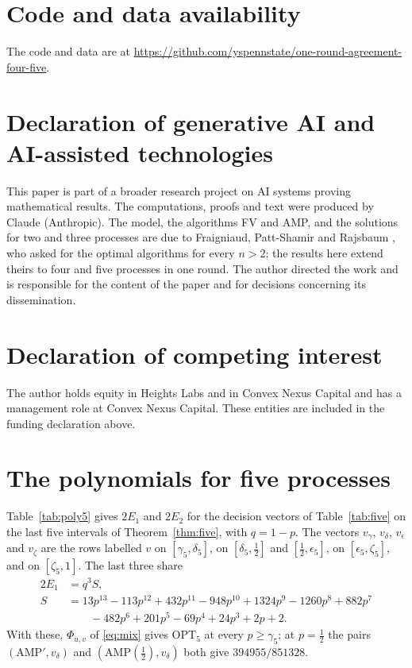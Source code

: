 \documentclass[11pt]{article}
\newcommand{\OPT}{\mathrm{OPT}}
\newcommand{\h}{\tfrac12}
\begin{document}
\section*{Code and data availability}
The code and data are at \url{https://github.com/yspennstate/one-round-agreement-four-five}.
\section*{Declaration of generative AI and AI-assisted technologies}
This paper is part of a broader research project on AI systems proving mathematical results. The computations, proofs and text were produced by Claude (Anthropic). The model, the algorithms FV and AMP, and the solutions for two and three processes are due to Fraigniaud, Patt-Shamir and Rajsbaum \cite{FPR}, who asked for the optimal algorithms for every $n>2$; the results here extend theirs to four and five processes in one round. The author directed the work and is responsible for the content of the paper and for decisions concerning its dissemination.

\section*{Declaration of competing interest}
The author holds equity in Heights Labs and in Convex Nexus Capital and has a management role at Convex Nexus Capital. These entities are included in the funding declaration above.

\appendix
\section{The polynomials for five processes}

Table~\ref{tab:poly5} gives $2E_1$ and $2E_2$ for the decision vectors of Table~\ref{tab:five} on the last five intervals of Theorem~\ref{thm:five}, with $q=1-p$. The vectors $v_{\gamma}$, $v_{\delta}$, $v_{\epsilon}$ and $v_{\zeta}$ are the rows labelled $v$ on $[\gamma_5,\delta_5]$, on $[\delta_5,\h]$ and $[\h,\epsilon_5]$, on $[\epsilon_5,\zeta_5]$, and on $[\zeta_5,1]$. The last three share
\begin{align*}
2E_1&=q^3S,\\
S&=13p^{13}-113p^{12}+432p^{11}-948p^{10}+1324p^9-1260p^8+882p^7\\
&\qquad-482p^6+201p^5-69p^4+24p^3+2p+2.
\end{align*}
With these, $\Phi_{u,v}$ of \eqref{eq:mix} gives $\OPT_5$ at every $p\ge\gamma_5$; at $p=\h$ the pairs $(\mathrm{AMP}',v_\delta)$ and $(\mathrm{AMP}(\h),v_\delta)$ both give $394955/851328$.
\end{document}
